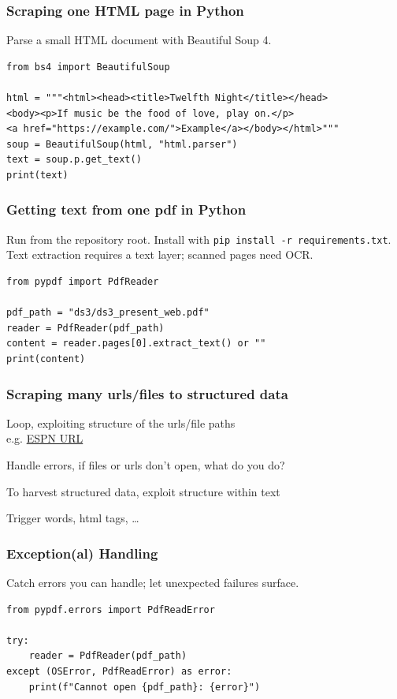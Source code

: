 \documentclass[compress, black]{beamer}
\begin{document}
\begin{frame}[fragile]
\frametitle{Scraping one HTML page in Python}
Parse a small HTML document with Beautiful Soup 4.
\small
\begin{verbatim}
from bs4 import BeautifulSoup

html = """<html><head><title>Twelfth Night</title></head>
<body><p>If music be the food of love, play on.</p>
<a href="https://example.com/">Example</a></body></html>"""
soup = BeautifulSoup(html, "html.parser")
text = soup.p.get_text()
print(text)
\end{verbatim}
\end{frame}

\begin{frame}[fragile]
\frametitle{Getting text from one pdf in Python}
Run from the repository root. Install with \texttt{pip install -r requirements.txt}. Text extraction requires a text layer; scanned pages need OCR.
\small
\begin{verbatim}
from pypdf import PdfReader

pdf_path = "ds3/ds3_present_web.pdf"
reader = PdfReader(pdf_path)
content = reader.pages[0].extract_text() or ""
print(content)
\end{verbatim}
\end{frame}

\begin{frame}[fragile]
  \frametitle{Scraping many urls/files to structured data}
  \begin{large_enum}
    \item[-]<1->Loop, exploiting structure of the urls/file paths\\\normalsize \pause
           e.g. \href{http://search.espncricinfo.com/ci/content/match/search.html?search=odi;all=1;page=1}{ESPN URL}
    \item[-]<3->Handle errors, if files or urls don't open, what do you do?
    \item[-]<4->To harvest structured data, exploit structure within text
    \item[-]<5->Trigger words, html tags, \ldots
  \end{large_enum}
\end{frame}

\begin{frame}[fragile]
\frametitle{Exception(al) Handling}
Catch errors you can handle; let unexpected failures surface.
\small
\begin{verbatim}
from pypdf.errors import PdfReadError

try:
    reader = PdfReader(pdf_path)
except (OSError, PdfReadError) as error:
    print(f"Cannot open {pdf_path}: {error}")
\end{verbatim}
\end{frame}
\end{document}
